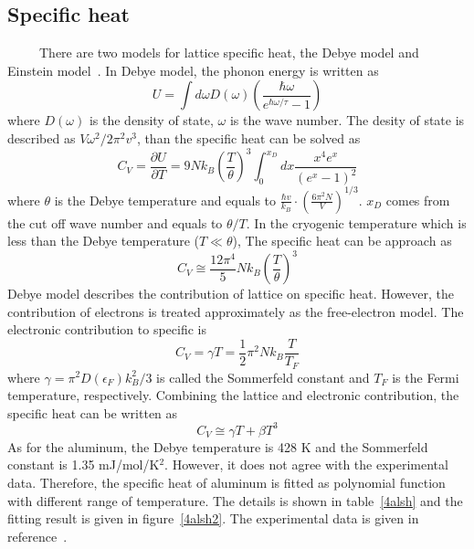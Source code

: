 \subsection{Specific heat}
~~~~~There are two models for lattice specific heat, the Debye model and Einstein model~\cite{kittle}.
In Debye model, the phonon energy is written as
\begin{equation}
 U = \int d\omega D(\omega) (\frac{\hbar \omega}{e^{\hbar \omega / \tau}-1})
\end{equation}
where $D(\omega)$ is the density of state, $\omega$ is the wave number.
The desity of state is described as $V\omega^2/2\pi^2v^3$, than the specific heat can be solved as
\begin{equation}
 C_V = \frac{\partial U}{\partial T} = 9 N k_B (\frac{T}{\theta})^3 \int^{x_D}_{0} dx \frac{x^4 e^x}{(e^x-1)^2}
\end{equation}
where $\theta$ is the Debye temperature and equals to $\frac{\hbar v}{k_B} \cdot (\frac{6\pi^2 N}{V})^{1/3}$.
$x_D$ comes from the cut off wave number and equals to $\theta/T$.
In the cryogenic temperature which is less than the Debye temperature ($T\ll\theta$), The specific heat can be approach as
\begin{equation}
 C_V \cong \frac{12 \pi^4}{5} N k_B (\frac{T}{\theta})^3
\end{equation}
Debye model describes the contribution of lattice on specific heat.
However, the contribution of electrons is treated approximately as the free-electron model.
The electronic contribution to specific is
\begin{equation}
 C_V = \gamma T = \frac{1}{2} \pi^2 N k_B \frac{T}{T_F}
\end{equation}
where $\gamma = \pi^2 D(\epsilon_F)k_B^2/3$ is called the Sommerfeld constant and $T_F$ is the Fermi temperature, respectively.
Combining the lattice and electronic contribution, the specific heat can be written as
\begin{equation}
 C_V \cong \gamma T + \beta T^3
\end{equation}
As for the aluminum, the Debye temperature is 428 K and the Sommerfeld constant is 1.35 mJ/mol/K$^2$.
However, it does not agree with the experimental data.
Therefore, the specific heat of aluminum is fitted as polynomial function with different range of temperature.
The details is shown in table~\ref{4alsh} and the fitting result is given in figure~\ref{4alsh2}.
The experimental data is given in reference~\cite{aldata}.
